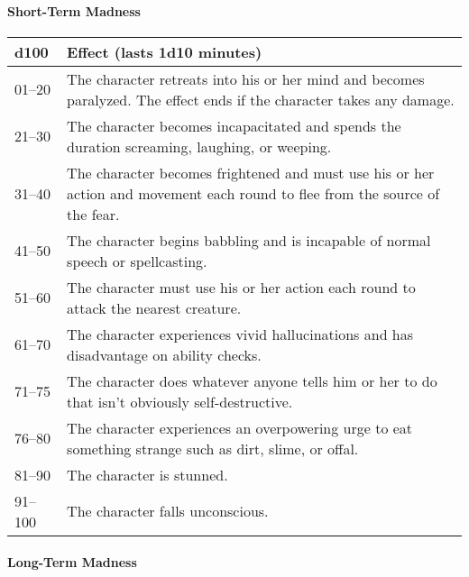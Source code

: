 \documentclass[
]{article}
\begin{document}
\hypertarget{short-term-madness}{%
\paragraph{Short-Term Madness}\label{short-term-madness}}

\begin{longtable}[]{@{}ll@{}}
\toprule
d100 & Effect (lasts 1d10 minutes)\tabularnewline
\midrule
\endhead
01--20 & The character retreats into his or her mind and becomes
paralyzed. The effect ends if the character takes any
damage.\tabularnewline
21--30 & The character becomes incapacitated and spends the duration
screaming, laughing, or weeping.\tabularnewline
31--40 & The character becomes frightened and must use his or her action
and movement each round to flee from the source of the
fear.\tabularnewline
41--50 & The character begins babbling and is incapable of normal speech
or spellcasting.\tabularnewline
51--60 & The character must use his or her action each round to attack
the nearest creature.\tabularnewline
61--70 & The character experiences vivid hallucinations and has
disadvantage on ability checks.\tabularnewline
71--75 & The character does whatever anyone tells him or her to do that
isn't obviously self-destructive.\tabularnewline
76--80 & The character experiences an overpowering urge to eat something
strange such as dirt, slime, or offal.\tabularnewline
81--90 & The character is stunned.\tabularnewline
91--100 & The character falls unconscious.\tabularnewline
\bottomrule
\end{longtable}

\hypertarget{long-term-madness}{%
\paragraph{Long-Term Madness}\label{long-term-madness}}
\end{document}
